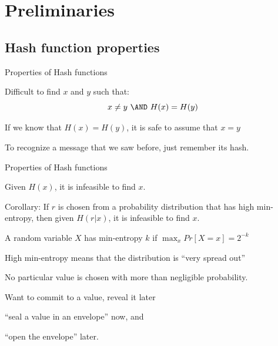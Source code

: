 \section{Preliminaries}

\subsection{Hash function properties}

\begin{frame}{Properties of Hash functions}

\BIL
\item Difficult to find $x$ and $y$ such that:
\[
  x \neq y\ \AND\ H(x)=H(y)
\]
\EIL
{}
\BIL
\item If we know that $H(x)=H(y)$, it is safe to assume
that $x=y$
\item To recognize a message that we saw before, just remember its hash.
\EIL
	
\end{frame}


\begin{frame}{Properties of Hash functions}


\BIL
\item Given $H(x)$, it is infeasible to find $x$.

\item Corollary: If $r$ is chosen from a probability distribution that has high \alert{min-entropy}, then given $H(r | x)$, it is infeasible to find $x$.
\item A random variable $X$ has \alert{min-entropy} $k$ if $\max_x Pr[X=x] = 2^{-k}$
\BI
\item High min-entropy means that the distribution is “very spread out”
\item No particular value is chosen with more than negligible probability.
\EI

\EIL

\BIL
\item Want to commit to a value, reveal it later
\BI 
\item “seal a value in an envelope” now, and
\item	“open the envelope” later.
\EI
\EIL

\end{frame}

